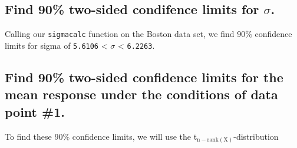 \documentclass[11pt]{article}
\begin{document}
\subsection{Find 90\% two-sided condifence limits for $\sigma$.}
\label{sec-2-1}


Calling our \verb~sigmacalc~ function on the Boston data set, we find 90\%
confidence limits for sigma of
\texttt{5.6106} < $\sigma$ < \texttt{6.2263}.
\subsection{Find 90\% two-sided confidence limits for the mean response under the conditions of data point \#1.}
\label{sec-2-2}



To find these 90\% confidence limits, we will use the t$_{\mathrm{n-rank(X)}}$-distribution
\end{document}
